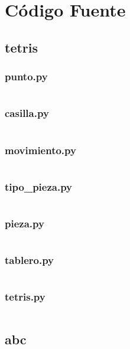 \chapter{Código Fuente}
\label{apendice:code}
\lstset{inputencoding=utf8/latin1}
%

\section{tetris}

\subsection{punto.py}
\inputminted[linenos]{python}{../codigo/abejas_tetris/tetris/punto.py}
\subsection{casilla.py}
\inputminted[linenos]{python}{../codigo/abejas_tetris/tetris/casilla.py}
\subsection{movimiento.py}
\inputminted[linenos]{python}{../codigo/abejas_tetris/tetris/movimiento.py}
\subsection{tipo\_pieza.py}
\inputminted[linenos]{python}{../codigo/abejas_tetris/tetris/tipo_pieza.py}
\subsection{pieza.py}
\inputminted[linenos]{python}{../codigo/abejas_tetris/tetris/pieza.py}
\subsection{tablero.py}
\inputminted[linenos]{python}{../codigo/abejas_tetris/tetris/tablero.py}
\subsection{tetris.py}
\inputminted[linenos]{python}{../codigo/abejas_tetris/tetris/tetris.py}

\section{abc}


